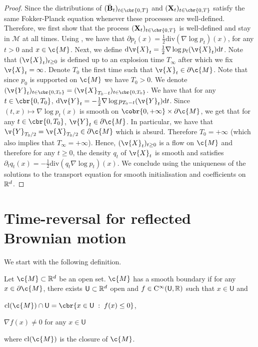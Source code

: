 \begin{proof}
	Since the distributions of \((\bar{\mathbf{B}}_t)_{t \in \cbr{0,T}}\) and \((\mathbf{X}_t)_{t \in \cbr{0,T}}\) satisfy the same Fokker-Planck equation whenever these processes are well-defined.
	Therefore, we first show that the process \((\mathbf{X}_t)_{t \in \cbr{0,T}}\) is well-defined and stay in \(\mathcal{M}\) at all times.
	Using \cite[Theorem 2.2]{burdzy2004heat}, we have that \(\partial p_t(x) = \tfrac{1}{2} \mathrm{div}(\nabla \log p_t)(x)\), for any \(t > 0\) and \(x \in \c{M}\).
	Next, we define \(\mathrm{d} \v{X}_t = \tfrac{1}{2} \nabla \log p_t(\v{X}_t) \mathrm{d} t\).
	Note that \((\v{X}_t)_{t \geq 0}\) is defined up to an explosion time \(T_\infty\) after which we fix \(\v{X}_t = \infty\).
	Denote \(T_0\) the first time such that \(\v{X}_t \in \partial \c{M}\).
	Note that since \(p_0\) is supported on \(\c{M}\) we have \(T_0 > 0\).
	We denote \((\v{Y}_t)_{t \in \cbr{0,T_0}} = (\v{X}_{T_0-t})_{t \in \cbr{0,T_0}}\).
	We have that for any \(t \in \cbr{0,T_0}\), \(\mathrm{d} \v{Y}_t = -\tfrac{1}{2} \nabla \log p_{T_0-t}(\v{Y}_t) \mathrm{d} t\).
	Since \((t,x) \mapsto \nabla \log p_t(x)\) is smooth on \(\cobr{0,+\infty} \times \partial \c{M}\), we get that for any \(t \in \cbr{0,T_0}\), \(\v{Y}_t \in \partial \c{M}\).
	In particular, we have that \(\v{Y}_{T_0/2} = \v{X}_{T_0/2} \in \partial \c{M}\) which is absurd.
	Therefore \(T_0 = +\infty\) (which also implies that \(T_\infty = +\infty\)).
	Hence, \((\v{X}_t)_{t \geq 0}\) is a flow on \(\c{M}\) and therefore for any \(t \geq 0\), the density \(q_t\) of \(\v{X}_t\) is smooth and satisfies \(\partial_t q_t(x) = -\tfrac{1}{2} \mathrm{div}(q_t \nabla \log p_t )(x)\).
	We conclude using the uniqueness of the solutions to the transport equation for smooth initialisation and coefficients on \(\mathbb{R}^d\).
\end{proof}

\section{Time-reversal for reflected Brownian motion}
\label{sec:time-revers-refl}

We start with the following definition.

\begin{definition}
	Let \(\c{M} \subset \R^d\) be an open set.
	\(\c{M}\) has a smooth boundary if for any
	\(x \in \partial \c{M}\), there exists \(\mathsf{U} \subset \mathbb{R}^d\) open and
	\(f \in \mathrm{C}^\infty(\mathsf{U}, \mathbb{R})\) such that \(x \in \mathsf{U}\) and
	\begin{enumerate*}[label=(\alph*)]
		\item \(\mathrm{cl}(\c{M}) \cap \mathsf{U} = \cbr{x \in \mathsf{U} \; : \; f(x) \leq 0}\),
		\item \(\nabla f(x) \neq 0\) for any \(x \in \mathsf{U}\)
	\end{enumerate*}
	where \(\mathrm{cl}(\c{M})\) is the closure of \(\c{M}\).
\end{definition}

